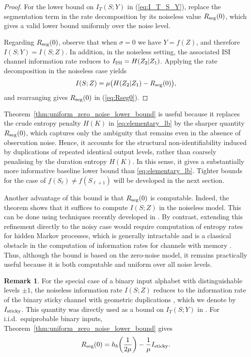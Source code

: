 \documentclass[onecolumn]{IEEEtran}
\theoremstyle{definition}
\newtheorem{remark}{Remark}
\begin{document}
\begin{proof}
For the lower bound on $I_T(S;Y)$ in (\ref{eq:I_T_S_Y}), replace the segmentation term in the rate decomposition by its noiseless value $R_{\rm seg}(0)$, which gives a valid lower bound uniformly over the noise level.

Regarding $R_{\rm seg}(0)$, observe that when $\sigma=0$ we have $Y=f(Z)$, and therefore $I(S;Y)=I(S;Z)$. In addition, in the noiseless setting, the associated ISI channel information rate reduces to $I_{\rm ISI}=H(Z_2|Z_1)$. Applying the rate decomposition in the noiseless case yields
\begin{align*}
    I(S;Z)=\mu\bigl(H(Z_2|Z_1)-R_{\rm seg}(0)\bigr),
\end{align*}
and rearranging gives $R_{\rm seg}(0)$ in (\ref{eq:Rseg0}).
\end{proof}

Theorem~\ref{thm:uniform_zero_noise_lower_bound} is useful because it replaces the crude entropy penalty $H(K)$ in \eqref{eq:elementary_lb} by the sharper quantity $R_{\rm seg}(0)$, which captures only the ambiguity that remains even in the absence of observation noise. Hence, it accounts for the structural non-identifiability induced by duplications of repeated identical output levels, rather than coarsely penalising by the duration entropy $H(K)$. In this sense, it gives a substantially more informative baseline lower bound than \eqref{eq:elementary_lb}. Tighter bounds for the case of $f(S_{\ell}) \neq f(S_{\ell+1})$ will be developed in the next section.

Another advantage of this bound is that $R_{\rm seg}(0)$ is computable. Indeed, the theorem shows that it suffices to compute $I(S;Z)$ in the noiseless model. This can be done using techniques recently developed in \cite{Rameshwar2025}. By contrast, extending this refinement directly to the noisy case would require computation of entropy rates for hidden Markov processes, which is generally intractable and is a classical obstacle in the computation of information rates for channels with memory \cite{Pfister2001,Arnold2001}. Thus, although the bound is based on the zero-noise model, it remains practically useful because it is both computable and uniform over all noise levels.

\begin{remark}For the special case of a binary input alphabet with distinguishable levels $\pm1$, the noiseless information rate $I(S;Z)$ reduces to the information rate of the binary sticky channel with geometric duplications \cite{Mitzenmacher2007}, which we denote by $I_{\rm sticky}$. This quantity was directly used as a bound on $I_T(S;Y)$ in \cite{McBain2024b}. For i.i.d.\ equiprobable binary inputs, Theorem~\ref{thm:uniform_zero_noise_lower_bound} gives
\begin{align*}
    R_{\rm seg}(0)
    = h_b\!\left(\frac{1}{2\mu}\right)-\frac{1}{\mu}I_{\rm sticky}.
\end{align*}
\end{remark}
\end{document}

